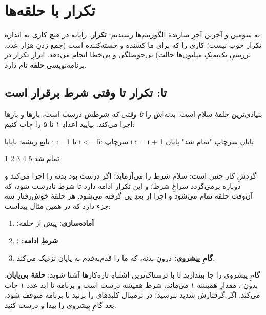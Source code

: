 \chapter{تکرار با حلقه‌ها}%
\label{ch:loops}

به سومین و آخرین آجرِ سازندهٔ الگوریتم‌ها رسیدیم: \textbf{تکرار}. رایانه در
هیچ کاری به اندازهٔ تکرار خوب نیست؛ کاری را که برای ما کشنده و خسته‌کننده
است (جمع زدنِ هزار عدد، بررسیِ یک‌به‌یکِ میلیون‌ها حالت) بی‌حوصلگی و
بی‌خطا انجام می‌دهد. ابزارِ تکرار در برنامه‌نویسی \textbf{حلقه} نام دارد.

\section{تا: تکرار تا وقتی شرط برقرار است}

بنیادی‌ترین حلقهٔ سلام  است: بدنه‌اش را \emph{تا وقتی که} شرطش
درست است، بارها و بارها اجرا می‌کند. بیایید اعدادِ ۱ تا ۵ را چاپ کنیم:

\begin{salamfa}
تابع ریشه:
    ناپایا i := 1
    تا i <= 5:
        سرچاپ i
        i = i + 1
    پایان
    سرچاپ "تمام شد"
پایان
\end{salamfa}

\begin{progoutfa}
1
2
3
4
5
تمام شد
\end{progoutfa}

گردشِ کار چنین است: سلام شرط را می‌آزماید؛ اگر درست بود بدنه را اجرا
می‌کند و دوباره برمی‌گردد سراغِ شرط؛ و این تکرار ادامه دارد تا شرط نادرست
شود، که آن‌وقت حلقه تمام می‌شود و اجرا از بعدِ  پی گرفته می‌شود.
هر حلقهٔ خوش‌رفتار سه جزء دارد که در همین مثال پیداست:

\begin{enumerate}
  \item \textbf{آماده‌سازی:}  پیش از حلقه؛
  \item \textbf{شرطِ ادامه:} ؛
  \item \textbf{گامِ پیشروی:}  درونِ بدنه، که ما را
        قدم‌به‌قدم به پایان نزدیک می‌کند.
\end{enumerate}

\begin{warn}
گامِ پیشروی را جا بیندازید تا با ترسناک‌ترین اشتباهِ تازه‌کارها آشنا شوید:
\textbf{حلقهٔ بی‌پایان}. بدونِ ، مقدارِ  همیشه ۱
می‌ماند، شرط همیشه درست است و برنامه تا ابد عدد ۱ چاپ می‌کند. اگر گرفتارش
شدید نترسید؛ در ترمینال کلیدهای  را بزنید تا برنامه متوقف شود،
بعد گامِ پیشروی را پیدا و درست کنید.
\end{warn}

